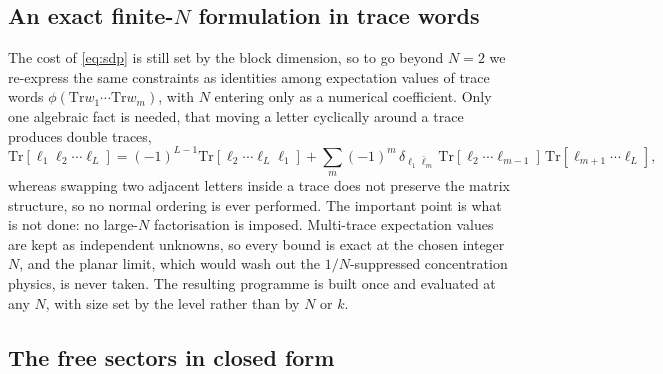\documentclass[10pt]{article}
\newcommand{\Tr}{\mathrm{Tr}}
\begin{document}
\subsection{An exact finite-$N$ formulation in trace words}

The cost of \eqref{eq:sdp} is still set by the block dimension, so to go beyond $N=2$ we re-express the same
constraints as identities among expectation values of trace words $\phi(\Tr w_1\cdots\Tr w_m)$, with $N$
entering only as a numerical coefficient. Only one algebraic fact is needed, that moving a letter cyclically
around a trace produces double traces,
\begin{equation}
\Tr[\ell_1\ell_2\cdots\ell_L]=(-1)^{L-1}\Tr[\ell_2\cdots\ell_L\ell_1]
+\sum_{m}(-1)^m\,\delta_{\ell_1\bar\ell_m}\,\Tr[\ell_2\cdots\ell_{m-1}]\,\Tr[\ell_{m+1}\cdots\ell_L],
\end{equation}
whereas swapping two adjacent letters inside a trace does not preserve the matrix structure, so no normal
ordering is ever performed. The important point is what is not done: no large-$N$ factorisation is imposed.
Multi-trace expectation values are kept as independent unknowns, so every bound is exact at the chosen integer
$N$, and the planar limit, which would wash out the $1/N$-suppressed concentration physics, is never taken. The
resulting programme is built once and evaluated at any $N$, with size set by the level rather than by $N$ or $k$.

\subsection{The free sectors in closed form}
\end{document}
